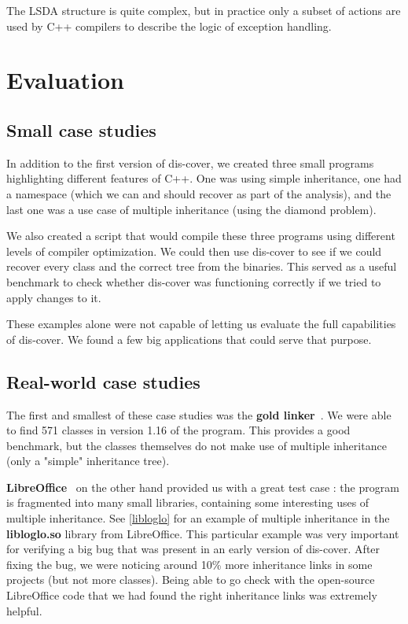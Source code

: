 \documentclass[a4paper,11pt,oneside]{report}
\begin{document}
The LSDA structure is quite complex, but in practice only a subset of actions
are used by C++ compilers to describe the logic of exception handling.

\chapter{Evaluation}
\label{evalchapter}



\section{Small case studies}

In addition to the first version of dis-cover, we created three small programs 
highlighting different features of C++.
One was using simple inheritance,
one had a namespace (which we can and should recover as part of the analysis),
and the last one was a use case of multiple inheritance (using the diamond 
problem).

We also created a script that would compile these three programs using
different levels of compiler optimization.
We could then use dis-cover to see if we could recover every class and the 
correct tree from the binaries.
This served as a useful benchmark to check whether dis-cover was functioning 
correctly if we tried to apply changes to it.

These examples alone were not capable of letting us evaluate the full 
capabilities of dis-cover.
We found a few big applications that could serve that purpose.

\section{Real-world case studies}

The first and smallest of these case studies was the \textbf{gold 
linker}~\cite{gold}.
We were able to find 571 classes in version 1.16 of the program.
This provides a good benchmark, but the classes themselves do not make use of 
multiple inheritance (only a "simple" inheritance tree).

\textbf{LibreOffice}~\cite{libreoffice} on the other hand provided us with a 
great test case :
the program is fragmented into many small libraries, containing some 
interesting uses of multiple inheritance.
See \autoref{libloglo} for an example of multiple inheritance in the 
\textbf{libloglo.so} library from LibreOffice.
This particular example was very important for verifying a big bug that was 
present in an early version of dis-cover.
After fixing the bug, we were noticing around 10\% more inheritance links in 
some projects (but not more classes).
Being able to go check with the open-source LibreOffice code that we had found 
the right inheritance links was extremely helpful.
\end{document}
